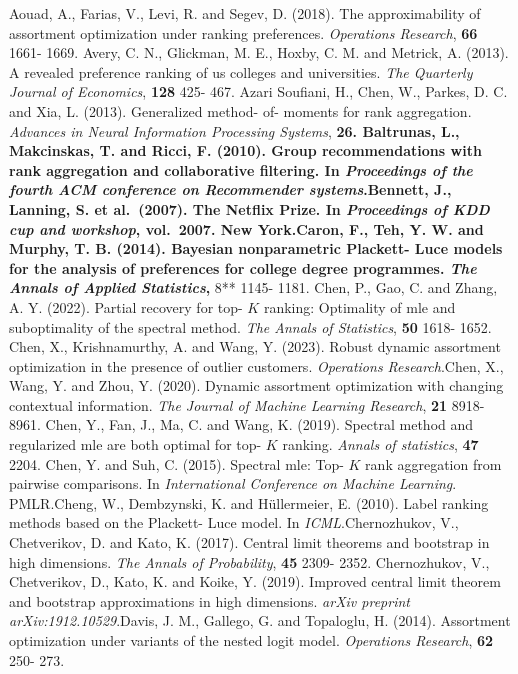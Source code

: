 Aouad, A., Farias, V., Levi, R. and Segev, D. (2018). The
approximability of assortment optimization under ranking preferences.
\emph{Operations Research}, \textbf{66} 1661- 1669. Avery, C. N.,
Glickman, M. E., Hoxby, C. M. and Metrick, A. (2013). A revealed
preference ranking of us colleges and universities. \emph{The Quarterly
Journal of Economics}, \textbf{128} 425- 467. Azari Soufiani, H., Chen,
W., Parkes, D. C. and Xia, L. (2013). Generalized method- of- moments
for rank aggregation. \emph{Advances in Neural Information Processing
Systems}, \textbf{26. Baltrunas, L., Makcinskas, T. and Ricci, F.
(2010). Group recommendations with rank aggregation and collaborative
filtering. In \emph{Proceedings of the fourth ACM conference on
Recommender systems}.Bennett, J., Lanning, S. et al.~(2007). The Netflix
Prize. In \emph{Proceedings of KDD cup and workshop}, vol.~2007. New
York.Caron, F., Teh, Y. W. and Murphy, T. B. (2014). Bayesian
nonparametric Plackett- Luce models for the analysis of preferences for
college degree programmes. \emph{The Annals of Applied Statistics},} 8**
1145- 1181. Chen, P., Gao, C. and Zhang, A. Y. (2022). Partial recovery
for top- \(K\) ranking: Optimality of mle and suboptimality of the
spectral method. \emph{The Annals of Statistics}, \textbf{50} 1618-
1652. Chen, X., Krishnamurthy, A. and Wang, Y. (2023). Robust dynamic
assortment optimization in the presence of outlier customers.
\emph{Operations Research}.Chen, X., Wang, Y. and Zhou, Y. (2020).
Dynamic assortment optimization with changing contextual information.
\emph{The Journal of Machine Learning Research}, \textbf{21} 8918- 8961.
Chen, Y., Fan, J., Ma, C. and Wang, K. (2019). Spectral method and
regularized mle are both optimal for top- \(K\) ranking. \emph{Annals of
statistics}, \textbf{47} 2204. Chen, Y. and Suh, C. (2015). Spectral
mle: Top- \(K\) rank aggregation from pairwise comparisons. In
\emph{International Conference on Machine Learning}. PMLR.Cheng, W.,
Dembzynski, K. and Hüllermeier, E. (2010). Label ranking methods based
on the Plackett- Luce model. In \emph{ICML}.Chernozhukov, V.,
Chetverikov, D. and Kato, K. (2017). Central limit theorems and
bootstrap in high dimensions. \emph{The Annals of Probability},
\textbf{45} 2309- 2352. Chernozhukov, V., Chetverikov, D., Kato, K. and
Koike, Y. (2019). Improved central limit theorem and bootstrap
approximations in high dimensions. \emph{arXiv preprint
arXiv:1912.10529}.Davis, J. M., Gallego, G. and Topaloglu, H. (2014).
Assortment optimization under variants of the nested logit model.
\emph{Operations Research}, \textbf{62} 250- 273.

